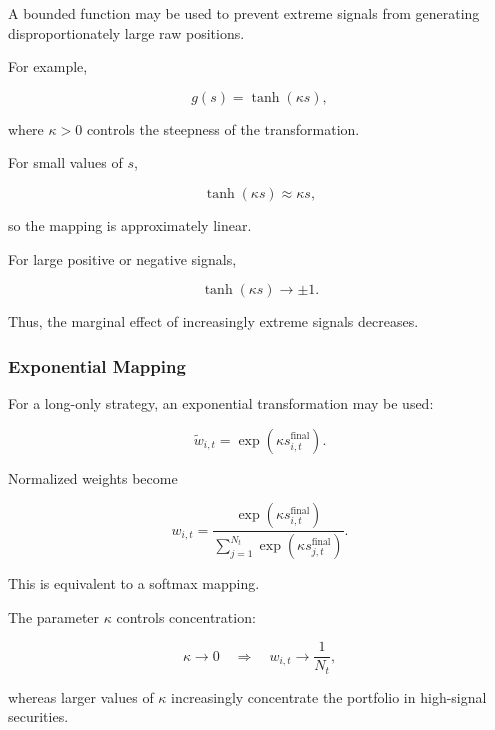 \documentclass[11pt,a4paper]{article}
\begin{document}
A bounded function may be used to prevent extreme signals from generating
disproportionately large raw positions.

For example,

\begin{equation}
\boxed{
g(s)
=
\tanh(\kappa s),
}
\end{equation}

where $\kappa>0$ controls the steepness of the transformation.

For small values of $s$,

\begin{equation}
\tanh(\kappa s)
\approx
\kappa s,
\end{equation}

so the mapping is approximately linear.

For large positive or negative signals,

\begin{equation}
\tanh(\kappa s)
\rightarrow
\pm1.
\end{equation}

Thus, the marginal effect of increasingly extreme signals decreases.


\subsubsection{Exponential Mapping}

For a long-only strategy, an exponential transformation may be used:

\begin{equation}
\widetilde{w}_{i,t}
=
\exp
\left(
\kappa s_{i,t}^{\mathrm{final}}
\right).
\end{equation}

Normalized weights become

\begin{equation}
\boxed{
w_{i,t}
=
\frac{
\exp(\kappa s_{i,t}^{\mathrm{final}})
}{
\sum_{j=1}^{N_t}
\exp(\kappa s_{j,t}^{\mathrm{final}})
}.
}
\end{equation}

This is equivalent to a softmax mapping.

The parameter $\kappa$ controls concentration:

\begin{equation}
\kappa\rightarrow0
\quad\Rightarrow\quad
w_{i,t}\rightarrow\frac{1}{N_t},
\end{equation}

whereas larger values of $\kappa$ increasingly concentrate the portfolio in
high-signal securities.
\end{document}
